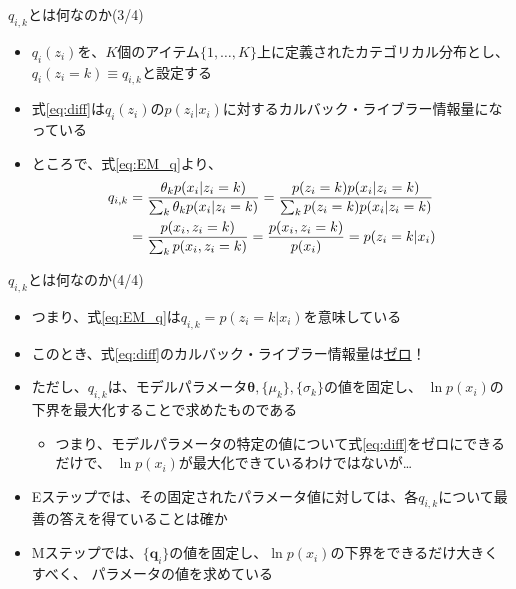 \documentclass[aspectratio=169,unicode,dvipdfmx,14pt]{beamer}
\begin{document}
\begin{frame}{$q_{i,k}$とは何なのか(3/4)}
\vspace{-.05in}
\begin{itemize}
\item $q_i(z_i)$を、$K$個のアイテム$\{1,\ldots,K\}$上に定義されたカテゴリカル分布とし、
$q_i(z_i=k) \equiv q_{i,k}$と設定する
\item 式\eqref{eq:diff}は$q_i(z_i)$の$p(z_i|x_i)$に対するカルバック・ライブラー情報量になっている
\item ところで、式\eqref{eq:EM_q}より、
\begin{align}
q_{i,k} & = \frac{ \theta_k p(x_i | z_i = k) }{ \sum_k \theta_k p(x_i | z_i = k) }
= \frac{p(z_i=k)p(x_i|z_i=k)}{\sum_k p(z_i=k)p(x_i|z_i=k)}
\notag \\ &
= \frac{p(x_i,z_i=k)}{\sum_k p(x_i,z_i=k)} = \frac{p(x_i,z_i=k)}{p(x_i)} = p(z_i=k|x_i)
\end{align}
\end{itemize}
\end{frame}

\begin{frame}{$q_{i,k}$とは何なのか(4/4)}
\begin{itemize}
\item つまり、式\eqref{eq:EM_q}は$q_{i,k} = p(z_i=k|x_i)$を意味している
\item このとき、式\eqref{eq:diff}のカルバック・ライブラー情報量は\underline{ゼロ}！
\item ただし、$q_{i,k}$は、モデルパラメータ$\bm{\theta},\{\mu_k\},\{\sigma_k\}$の値を固定し、
$\ln p(x_i)$の下界を最大化することで求めたものである
\begin{itemize}
\item つまり、モデルパラメータの特定の値について式\eqref{eq:diff}をゼロにできるだけで、
$\ln p(x_i)$が最大化できているわけではないが…
\end{itemize}
\item Eステップでは、その固定されたパラメータ値に対しては、各$q_{i,k}$について最善の答えを得ていることは確か
\item Mステップでは、$\{ \bm{q}_i \}$の値を固定し、$\ln p(x_i)$の下界をできるだけ大きくすべく、
パラメータの値を求めている
\end{itemize}
\end{frame}
\end{document}
